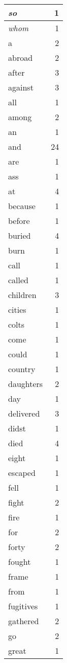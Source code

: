 \begin{center}
\begin{longtable}{l|r}
\emph{so} & 1\\ \hline 
\emph{whom} & 1\\ \hline 
a & 2\\ \hline 
abroad & 2\\ \hline 
after & 3\\ \hline 
against & 3\\ \hline 
all & 1\\ \hline 
among & 2\\ \hline 
an & 1\\ \hline 
and & 24\\ \hline 
are & 1\\ \hline 
ass & 1\\ \hline 
at & 4\\ \hline 
because & 1\\ \hline 
before & 1\\ \hline 
buried & 4\\ \hline 
burn & 1\\ \hline 
call & 1\\ \hline 
called & 1\\ \hline 
children & 3\\ \hline 
cities & 1\\ \hline 
colts & 1\\ \hline 
come & 1\\ \hline 
could & 1\\ \hline 
country & 1\\ \hline 
daughters & 2\\ \hline 
day & 1\\ \hline 
delivered & 3\\ \hline 
didst & 1\\ \hline 
died & 4\\ \hline 
eight & 1\\ \hline 
escaped & 1\\ \hline 
fell & 1\\ \hline 
fight & 2\\ \hline 
fire & 1\\ \hline 
for & 2\\ \hline 
forty & 2\\ \hline 
fought & 1\\ \hline 
frame & 1\\ \hline 
from & 1\\ \hline 
fugitives & 1\\ \hline 
gathered & 2\\ \hline 
go & 2\\ \hline 
great & 1\\ \hline 

\end{longtable}
\end{center}
